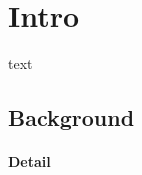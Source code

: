 \documentclass{article}
\begin{document}

\section{Intro}
\label{sec:intro}
text
\subsection{Background}
\paragraph{Detail}
\label{par:detail}
\end{document}
